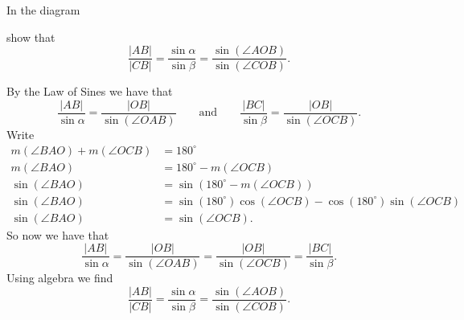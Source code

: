 \documentclass{ximera}
\begin{document}
\begin{problem}\label{46}
In the diagram
\begin{image}
\end{image}
show that
\[
\frac{\left\vert AB\right\vert }{\left\vert CB\right\vert }=\frac
{\sin\alpha}{\sin\beta}=\frac{\sin\left(  \angle
AOB\right)  }{\sin\left(  \angle COB\right)  }.
\]


\begin{freeResponse}
By the Law of Sines we have that
\[
\frac{|AB|}{\sin\alpha} = \frac{|OB|}{\sin(\angle OAB)}\qquad\text{and}\qquad\frac{|BC|}{\sin\beta} = \frac{|OB|}{\sin(\angle OCB)}.
\]
Write 
\begin{align*}
m\left(  \angle BAO\right)  +m\left(\angle OCB\right)  &=180^{\circ}\\
m\left(  \angle BAO\right)  &=180^{\circ}-m\left(\angle OCB\right)  \\
\sin\left(\angle BAO\right)  &=\sin\left(180^{\circ}-m\left(\angle OCB\right)\right)  \\
\sin\left(\angle BAO\right)  &=\sin\left(180^{\circ}\right)\cos\left(\angle OCB\right) - \cos\left(180^{\circ}\right)\sin\left(\angle OCB\right)\\ 
\sin\left(\angle BAO\right)  &=\sin\left(\angle OCB\right).
\end{align*}
So  now we have that 
\[
\frac{|AB|}{\sin\alpha} = \frac{|OB|}{\sin(\angle OAB)}= \frac{|OB|}{\sin(\angle OCB)}=\frac{|BC|}{\sin\beta}. 
\]
Using algebra we find 
\[
\frac{\left\vert AB\right\vert }{\left\vert CB\right\vert }=\frac
{\sin\alpha}{\sin\beta}=\frac{\sin\left(  \angle
AOB\right)  }{\sin\left(  \angle COB\right)  }.
\]
\end{freeResponse}
\end{problem}
\end{document}
